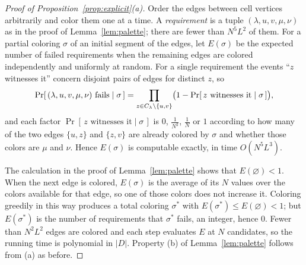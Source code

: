 \begin{proof}[Proof of Proposition~\ref{prop:explicit}(a)]
Order the edges between cell vertices arbitrarily and color them one at a
time. A \emph{requirement} is a tuple $(\lambda,u,v,\mu,\nu)$ as in the
proof of Lemma~\ref{lem:palette}; there are fewer than $N^5L^2$ of them. For
a partial coloring $\sigma$ of an initial segment of the edges, let
$E(\sigma)$ be the expected number of failed requirements when the remaining
edges are colored independently and uniformly at random. For a single
requirement the events ``$z$ witnesses it'' concern disjoint pairs of edges
for distinct $z$, so
\[
 \Pr[\,(\lambda,u,v,\mu,\nu)\text{ fails}\mid\sigma\,]
 =\prod_{z\in C_{\lambda}\setminus\{u,v\}}
 \bigl(1-\Pr[\,z\text{ witnesses it}\mid\sigma\,]\bigr),
\]
and each factor $\Pr[\,z\text{ witnesses it}\mid\sigma\,]$ is $0$,
$\tfrac1{N^2}$, $\tfrac1N$ or $1$ according to how many of the two edges
$\{u,z\}$ and $\{z,v\}$ are already colored by $\sigma$ and whether those
colors are $\mu$ and $\nu$. Hence $E(\sigma)$ is computable
exactly, in time $O(N^5L^3)$.

The calculation in the proof of Lemma~\ref{lem:palette} shows that
$E(\varnothing)<1$.
When the next edge is colored, $E(\sigma)$ is the average of its $N$ values
over the colors available for that edge, so one of those colors does not
increase it.
Coloring greedily in this way produces a total coloring $\sigma^\ast$ with
$E(\sigma^\ast)\le E(\varnothing)<1$; but $E(\sigma^\ast)$ is the number of
requirements that $\sigma^\ast$ fails, an integer, hence $0$. Fewer than
$N^2L^2$ edges are colored and each step evaluates $E$ at $N$ candidates, so
the running time is polynomial in $|D|$. Property (b) of
Lemma~\ref{lem:palette} follows from (a) as before.
\end{proof}

